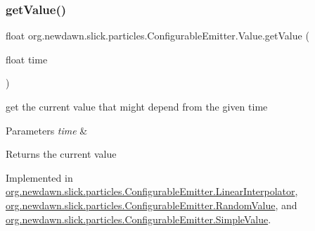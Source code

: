 \subsubsection{\texorpdfstring{get\+Value()}{getValue()}}
{\footnotesize\ttfamily float org.\+newdawn.\+slick.\+particles.\+Configurable\+Emitter.\+Value.\+get\+Value (\begin{DoxyParamCaption}\item[{float}]{time }\end{DoxyParamCaption})}

get the current value that might depend from the given time


\begin{DoxyParams}{Parameters}
{\em time} & \\
\hline
\end{DoxyParams}
\begin{DoxyReturn}{Returns}
the current value 
\end{DoxyReturn}


Implemented in \mbox{\hyperlink{classorg_1_1newdawn_1_1slick_1_1particles_1_1_configurable_emitter_1_1_linear_interpolator_a7fb3f27e9869dfbbadf4582335dff74e}{org.\+newdawn.\+slick.\+particles.\+Configurable\+Emitter.\+Linear\+Interpolator}}, \mbox{\hyperlink{classorg_1_1newdawn_1_1slick_1_1particles_1_1_configurable_emitter_1_1_random_value_ae9dc013f90bbed1ed8d25830a1e91f1f}{org.\+newdawn.\+slick.\+particles.\+Configurable\+Emitter.\+Random\+Value}}, and \mbox{\hyperlink{classorg_1_1newdawn_1_1slick_1_1particles_1_1_configurable_emitter_1_1_simple_value_a427ab1df90b809a575492d6e55e7357b}{org.\+newdawn.\+slick.\+particles.\+Configurable\+Emitter.\+Simple\+Value}}.

